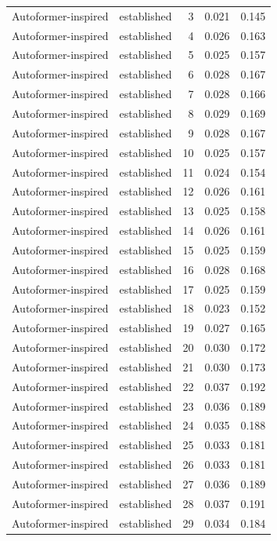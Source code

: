 \begin{tabular}{llrrr}
Autoformer-inspired & established & 3 & 0.021 & 0.145 \\
Autoformer-inspired & established & 4 & 0.026 & 0.163 \\
Autoformer-inspired & established & 5 & 0.025 & 0.157 \\
Autoformer-inspired & established & 6 & 0.028 & 0.167 \\
Autoformer-inspired & established & 7 & 0.028 & 0.166 \\
Autoformer-inspired & established & 8 & 0.029 & 0.169 \\
Autoformer-inspired & established & 9 & 0.028 & 0.167 \\
Autoformer-inspired & established & 10 & 0.025 & 0.157 \\
Autoformer-inspired & established & 11 & 0.024 & 0.154 \\
Autoformer-inspired & established & 12 & 0.026 & 0.161 \\
Autoformer-inspired & established & 13 & 0.025 & 0.158 \\
Autoformer-inspired & established & 14 & 0.026 & 0.161 \\
Autoformer-inspired & established & 15 & 0.025 & 0.159 \\
Autoformer-inspired & established & 16 & 0.028 & 0.168 \\
Autoformer-inspired & established & 17 & 0.025 & 0.159 \\
Autoformer-inspired & established & 18 & 0.023 & 0.152 \\
Autoformer-inspired & established & 19 & 0.027 & 0.165 \\
Autoformer-inspired & established & 20 & 0.030 & 0.172 \\
Autoformer-inspired & established & 21 & 0.030 & 0.173 \\
Autoformer-inspired & established & 22 & 0.037 & 0.192 \\
Autoformer-inspired & established & 23 & 0.036 & 0.189 \\
Autoformer-inspired & established & 24 & 0.035 & 0.188 \\
Autoformer-inspired & established & 25 & 0.033 & 0.181 \\
Autoformer-inspired & established & 26 & 0.033 & 0.181 \\
Autoformer-inspired & established & 27 & 0.036 & 0.189 \\
Autoformer-inspired & established & 28 & 0.037 & 0.191 \\
Autoformer-inspired & established & 29 & 0.034 & 0.184 \\

\end{tabular}
